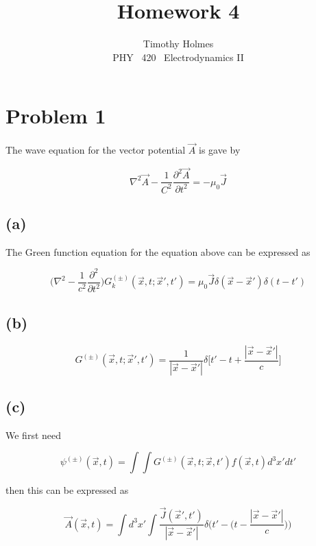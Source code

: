 \documentclass[11pt]{article}
\newcommand{\HWnum}{4}
\newcommand{\CourseNum}{420}           %
\newcommand{\Subject}{PHY}
\begin{document}

\title{Homework {\HWnum}}
\author{Timothy Holmes \\ \Subject ~ \CourseNum ~ Electrodynamics II}

\maketitle

\section*{Problem 1}

The wave equation for the vector potential $\vec{A}$ is gave by

$$
\nabla^{2} \vec{A} - \frac{1}{C^{2}} \frac{\partial^{2}\vec{A}}{\partial t^{2}} = - \mu_{0}\vec{J}
$$

\subsection*{(a)}

The Green function equation for the equation above can be expressed as

$$
\Bigg(\nabla^{2} - \frac{1}{c^{2}} \frac{\partial^{2}}{\partial t^{2}} \Bigg) G_{k}^{(\pm)} (\vec{x}, t; \vec{x}', t') = \mu_{0} \vec{J} \delta(\vec{x} - \vec{x}') \delta(t - t')  
$$

\subsection*{(b)}

$$
G^{(\pm)}(\vec{x}, t; \vec{x}', t') = \frac{1}{|\vec{x} - \vec{x}'|} \delta \Bigg[t' - t + \frac{|\vec{x} - \vec{x}'|}{c} \Bigg]
$$

\subsection*{(c)}

We first need

$$
\psi^{(\pm)}(\vec{x}, t) = \int \int G^{(\pm)}(\vec{x}, t; \vec{x}, t') f(\vec{x}, t) d^{3}x' dt' 
$$

then this can be expressed as

$$
\vec{A}(\vec{x}, t) = \int d^{3}x'\int  \frac{\vec{J}(\vec{x}', t')}{|\vec{x} - \vec{x}'|}\delta\Bigg(t' - \Bigg(t - \frac{|\vec{x} - \vec{x}'|}{c}\Bigg)\Bigg)
$$
\end{document}
